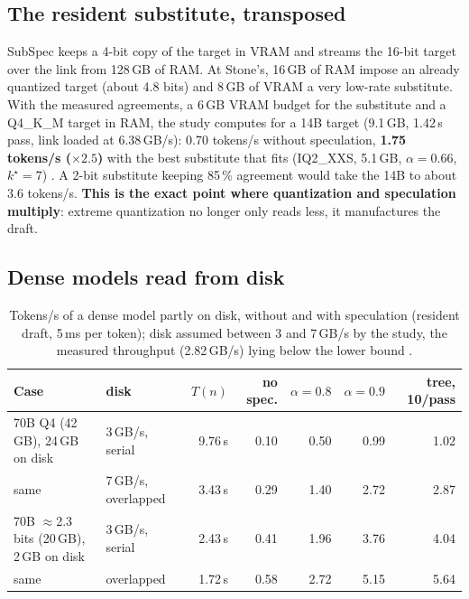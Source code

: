 \subsection{The resident substitute, transposed}

SubSpec keeps a 4-bit copy of the target in VRAM and streams the 16-bit target over the link from 128\,GB of RAM. At Stone's, 16\,GB of RAM impose an already quantized target (about 4.8 bits) and 8\,GB of VRAM a very low-rate substitute. With the measured agreements, a 6\,GB VRAM budget for the substitute and a Q4\_K\_M target in RAM, the study computes for a 14B target (9.1\,GB, 1.42\,s pass, link loaded at 6.38\,GB/s): 0.70 tokens/s without speculation, \textbf{1.75 tokens/s ($\times 2.5$)} with the best substitute that fits (IQ2\_XXS, 5.1\,GB, $\alpha = 0.66$, $k^\star = 7$) \calc. A 2-bit substitute keeping 85\,\% agreement would take the 14B to about 3.6 tokens/s. \textbf{This is the exact point where quantization and speculation multiply}: extreme quantization no longer only reads less, it manufactures the draft.

\subsection{Dense models read from disk}

\begin{table}[ht]
\centering\small
\caption[Speculation and dense models read from disk]{Tokens/s of a dense model partly on disk, without and with speculation (resident draft, 5\,ms per token); disk assumed between 3 and 7\,GB/s by the study, the measured throughput (2.82\,GB/s) lying below the lower bound \calc.}
\label{tab:spec-denses}
\begin{tabular}{@{}llrrrrr@{}}
\toprule
Case & disk & $T(n)$ & no spec. & $\alpha=0.8$ & $\alpha=0.9$ & tree, 10/pass \\
\midrule
70B Q4 (42\,GB), 24\,GB on disk & 3\,GB/s, serial & 9.76\,s & 0.10 & 0.50 & 0.99 & 1.02 \\
same & 7\,GB/s, overlapped & 3.43\,s & 0.29 & 1.40 & 2.72 & 2.87 \\
70B $\approx$2.3 bits (20\,GB), 2\,GB on disk & 3\,GB/s, serial & 2.43\,s & 0.41 & 1.96 & 3.76 & 4.04 \\
same & overlapped & 1.72\,s & 0.58 & 2.72 & 5.15 & 5.64 \\
\bottomrule
\end{tabular}
\end{table}

